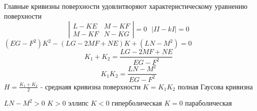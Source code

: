 \begin{theorem}
  Главные кривизны поверхности удовлитворяют характеристическому уравнению
  поверхности
  $$
  \left|
  \begin{array}{cc}
    L - KE & M - KF \\
    M - KF & N - KG
  \end{array}
  \right| = 0 ~~~ |II - kI| = 0
  $$
  $(EG - F^2)K^2 - (LG - 2MF + NE)K + (LN - M^2) = 0$
  $$
  K_1 + K_2 = \frac{LG - 2MF + NE}{EG - F^2}
  $$
  $$
  K_1 K_2 = \frac{LN - M^2}{EG - F^2}
  $$
  $H = \frac{K_1 + K_2}{2}$ - среднаяя кривизна поверхности
  $K = K_1 K_2$ полная Гаусова кривизна

  $LN - M^2 > 0$ $K > 0$ эллипс $K < 0$ гиперболическая $K = 0$ параболическая
\end{theorem}

